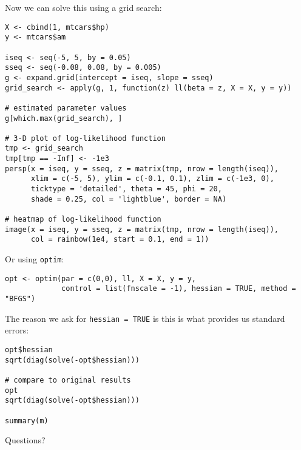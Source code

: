 \documentclass[a4paper,12pt]{article}
\begin{document}
Now we can solve this using a grid search:

\begin{lstlisting}
X <- cbind(1, mtcars$hp)
y <- mtcars$am

iseq <- seq(-5, 5, by = 0.05)
sseq <- seq(-0.08, 0.08, by = 0.005)
g <- expand.grid(intercept = iseq, slope = sseq)
grid_search <- apply(g, 1, function(z) ll(beta = z, X = X, y = y))

# estimated parameter values
g[which.max(grid_search), ]

# 3-D plot of log-likelihood function
tmp <- grid_search
tmp[tmp == -Inf] <- -1e3
persp(x = iseq, y = sseq, z = matrix(tmp, nrow = length(iseq)), 
      xlim = c(-5, 5), ylim = c(-0.1, 0.1), zlim = c(-1e3, 0), 
      ticktype = 'detailed', theta = 45, phi = 20, 
      shade = 0.25, col = 'lightblue', border = NA)

# heatmap of log-likelihood function
image(x = iseq, y = sseq, z = matrix(tmp, nrow = length(iseq)),
      col = rainbow(1e4, start = 0.1, end = 1))
\end{lstlisting}

Or using \texttt{optim}:

\begin{lstlisting}
opt <- optim(par = c(0,0), ll, X = X, y = y, 
             control = list(fnscale = -1), hessian = TRUE, method = "BFGS")
\end{lstlisting}


The reason we ask for \texttt{hessian = TRUE} is this is what provides us standard errors:

\begin{lstlisting}
opt$hessian
sqrt(diag(solve(-opt$hessian)))

# compare to original results
opt
sqrt(diag(solve(-opt$hessian)))

summary(m)
\end{lstlisting}

Questions?
\end{document}
